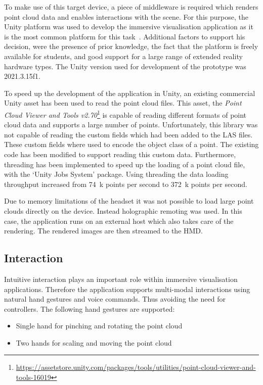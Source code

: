 To make use of this target device, a piece of middleware is required which renders point cloud data and enables interactions with the scene. For this purpose, the Unity platform was used to develop the immersive visualisation application as it is the most common platform for this task~\cite{Korkut23}. Additional factors to support his decision, were the presence of prior knowledge, the fact that the platform is freely available for students, and good support for a large range of extended reality hardware types. The Unity version used for development of the prototype was 2021.3.15f1.

To speed up the development of the application in Unity, an existing commercial Unity asset has been used to read the point cloud files. This asset, the \textit{Point Cloud Viewer and Tools v2.70}\footnote{\url{https://assetstore.unity.com/packages/tools/utilities/point-cloud-viewer-and-tools-16019}} is capable of reading different formats of point cloud data and supports a large number of points. Unfortunately, this library was not capable of reading the custom fields which had been added to the LAS files. These custom fields where used to encode the object class of a point. The existing code has been modified to support reading this custom data. Furthermore, threading has been implemented to speed up the loading of a point cloud file, with the `Unity Jobs System' package. Using threading the data loading throughput increased from 74~k points per second to 372~k points per second.

Due to memory limitations of the headset it was not possible to load large point clouds directly on the device. Instead holographic remoting was used. In this case, the application runs on an external host which also takes care of the rendering. The rendered images are then streamed to the HMD.

\subsection{Interaction}
Intuitive interaction plays an important role within immersive visualisation applications. Therefore the application supports multi-modal interactions using natural hand gestures and voice commands. Thus avoiding the need for controllers. The following hand gestures are supported:
\begin{itemize}
    \item Single hand for pinching and rotating the point cloud
    \item Two hands for scaling and moving the point cloud
\end{itemize}

